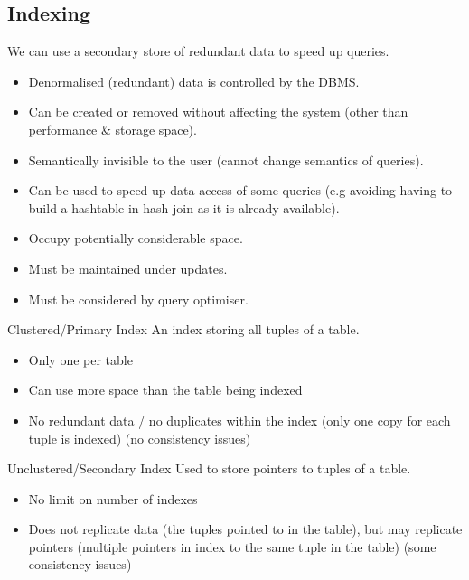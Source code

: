 \unfinished

\subsection{Indexing}
We can use a secondary store of redundant data to speed up queries.
\begin{itemize}
    \item Denormalised (redundant) data is controlled by the DBMS.
    \item Can be created or removed without affecting the system (other than performance \& storage space).
    \item Semantically invisible to the user (cannot change semantics of queries).
    \item Can be used to speed up data access of some queries (e.g avoiding having to build a hashtable in hash join as it is already available).
    \item Occupy potentially considerable space.
    \item Must be maintained under updates.
    \item Must be considered by query optimiser.
\end{itemize}
\begin{definitionbox}{Clustered/Primary Index}
    An index storing all tuples of a table.
    \begin{itemize}
        \item Only one per table
        \item Can use more space than the table being indexed
        \item No redundant data / no duplicates within the index (only one copy for each tuple is indexed) (no consistency issues)
    \end{itemize}
\end{definitionbox}
\begin{definitionbox}{Unclustered/Secondary Index}
    Used to store pointers to tuples of a table.
    \begin{itemize}
        \item No limit on number of indexes
        \item Does not replicate data (the tuples pointed to in the table), but may replicate pointers (multiple pointers in index to the same tuple in the table) (some consistency issues)
    \end{itemize}
\end{definitionbox}
